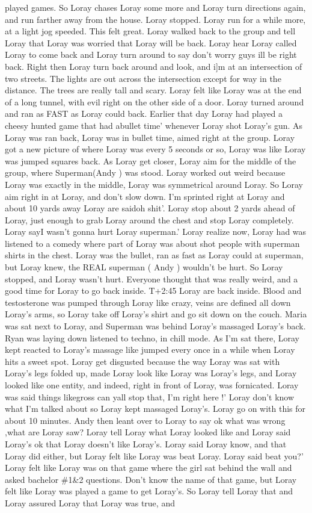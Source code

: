 \documentclass[12pt]{book}
\begin{document}
played games. So Loray chases Loray some more and Loray turn directions again, and run farther away from the house. Loray stopped. Loray run for a while more, at a light jog speeded. This felt great. Loray walked back to the group and tell Loray that Loray was worried that Loray will be back. Loray hear Loray called Loray to come back and Loray turn around to say don't worry guys ill be right back. Right then Loray turn back around and look, and i]m at an intersection of two streets. The lights are out across the intersection except for way in the distance. The trees are really tall and scary. Loray felt like Loray was at the end of a long tunnel, with evil right on the other side of a door. Loray turned around and ran as FAST as Loray could back. Earlier that day Loray had played a cheesy hunted game that had abullet time' whenever Loray shot Loray's gun. As Loray was ran back, Loray was in bullet time, aimed right at the group. Loray got a new picture of where Loray was every 5 seconds or so, Loray was like Loray was jumped squares back. As Loray get closer, Loray aim for the middle of the group, where Superman(Andy ) was stood. Loray worked out weird because Loray was exactly in the middle, Loray was symmetrical around Loray. So Loray aim right in at Loray, and don't slow down. I'm sprinted right at Loray and about 10 yards away Loray are saidoh shit'. Loray stop about 2 yards ahead of Loray, just enough to grab Loray around the chest and stop Loray completely. Loray sayI wasn't gonna hurt Loray superman.' Loray realize now, Loray had was listened to a comedy where part of Loray was about shot people with superman shirts in the chest. Loray was the bullet, ran as fast as Loray could at superman, but Loray knew, the REAL superman ( Andy ) wouldn't be hurt. So Loray stopped, and Loray wasn't hurt. Everyone thought that was really weird, and a good time for Loray to go back inside. T+2:45 Loray are back inside. Blood and testosterone was pumped through Loray like crazy, veins are defined all down Loray's arms, so Loray take off Loray's shirt and go sit down on the couch. Maria was sat next to Loray, and Superman was behind Loray's massaged Loray's back. Ryan was laying down listened to techno, in chill mode. As I'm sat there, Loray kept reacted to Loray's massage like jumped every once in a while when Loray hits a sweet spot. Loray get disgusted because the way Loray was sat with Loray's legs folded up, made Loray look like Loray was Loray's legs, and Loray looked like one entity, and indeed, right in front of Loray, was fornicated. Loray was said things likegross can yall stop that, I'm right here !' Loray don't know what I'm talked about so Loray kept massaged Loray's. Loray go on with this for about 10 minutes. Andy then leant over to Loray to say ok what was wrong ,what are Loray saw? Loray tell Loray what Loray looked like and Loray said Loray's ok that Loray doesn't like Loray's. Loray said Loray know, and that Loray did either, but Loray felt like Loray was beat Loray. Loray said beat you?' Loray felt like Loray was on that game where the girl sat behind the wall and asked bachelor \#1\&2 questions. Don't know the name of that game, but Loray felt like Loray was played a game to get Loray's. So Loray tell Loray that and Loray assured Loray that Loray was true, and 
\end{document}
